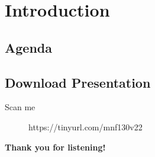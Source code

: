 
\begin{frame}[t,plain]
    \titlepage
\end{frame}

\section{Introduction}
\subsection*{Agenda}
\begin{frame}
    \tableofcontents
    
\end{frame}

\subsection*{Download Presentation}
\begin{frame}{Scan me}
    \begin{figure}
        \centering
        \caption{https://tinyurl.com/mnf130v22}
        \label{fig:qrcode}
    \end{figure}
\end{frame}


\begin{frame}
\begin{center}
\begin{Large}
\textbf{Thank you for listening!}

\end{Large}
\end{center}  
\end{frame}